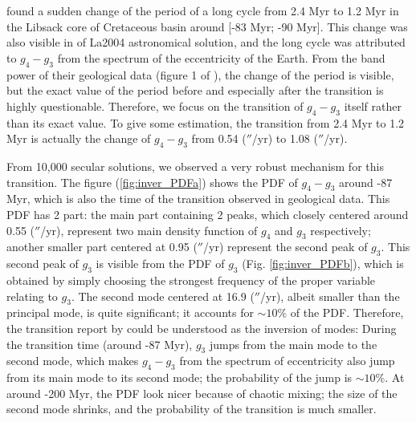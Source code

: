 \documentclass[12pt]{article}
\begin{document}
	\cite{ma2017} found a sudden change of the period of a long cycle from 2.4 Myr to 1.2 Myr in the Libsack core of Cretaceous basin around [-83 Myr; -90 Myr]. This change was also visible in of La2004 astronomical solution, and the long cycle was attributed to $g_4 - g_3$ from the spectrum of the eccentricity of the Earth. From the band power of their geological data (figure 1 of \cite{ma2017}), the change of the period is visible, but the exact value of the period before and especially after the transition is highly questionable. Therefore, we focus on the transition of $g_4 - g_3$ itself rather than its exact value. To give some estimation, the transition from 2.4 Myr to 1.2 Myr is actually the change of $g_4 - g_3$ from 0.54 ($''$/yr) to 1.08 ($''$/yr). 
	
	From 10,000 secular solutions, we observed a very robust mechanism for this transition. The figure (\ref{fig:inver_PDFa}) shows the PDF of $g_4 - g_3$ around -87 Myr, which is also the time of the transition observed in geological data. This PDF has 2 part: the main part containing 2 peaks, which closely centered around 0.55 ($''$/yr), represent two main density function of $g_4$ and $g_3$ respectively; another smaller part centered at 0.95 ($''$/yr) represent the second peak of $g_3$. This second peak of $g_3$ is visible from the PDF of $g_3$ (Fig. \ref{fig:inver_PDFb}), which is obtained by simply choosing the strongest frequency of the proper variable relating to $g_3$. The second mode centered at 16.9 ($''$/yr), albeit smaller than the principal mode, is quite significant; it accounts for $\sim 10 \% $ of the PDF. Therefore, the transition report by \cite{ma2017} could be understood as the inversion of modes: During the transition time (around -87 Myr), $g_3$ jumps from the main mode to the second mode, which makes $g_4 - g_3$ from the spectrum of eccentricity also jump from its main mode to its second mode; the probability of the jump is $\sim 10 \% $. 
	At around -200 Myr, the PDF look nicer because of chaotic mixing; the size of the second mode shrinks, and the probability of the transition is much smaller.   
\end{document}
